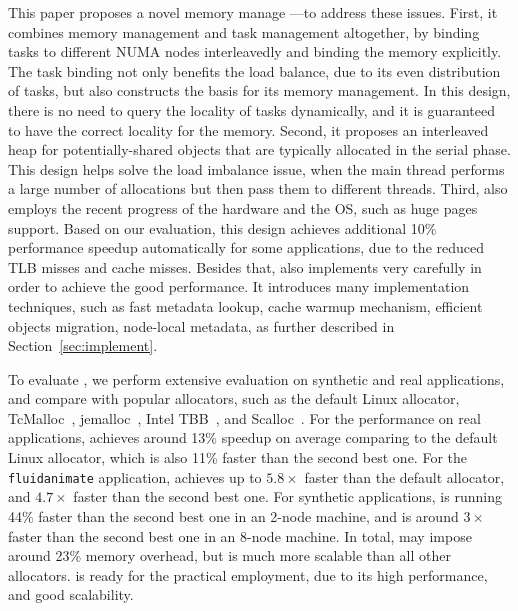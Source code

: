 This paper proposes a novel memory manage --\NM{}--to address these issues. First, it combines memory management and task management altogether, by binding tasks to different NUMA nodes interleavedly and binding the memory explicitly. The task binding not only benefits the load balance, due to its even distribution of tasks, but also constructs the basis for its memory management. In this design, there is no need to query the locality of tasks dynamically, and it is guaranteed to have the correct locality for the memory. Second, it proposes an interleaved heap for potentially-shared objects that are typically allocated in the serial phase. This design helps solve the load imbalance issue, when the main thread performs a large number of allocations but then pass them to different threads.  Third, \NM{} also employs the recent progress of the hardware and the OS, such as huge pages support. Based on our evaluation, this design achieves additional 10\% performance speedup automatically for some applications, due to the reduced TLB misses and cache misses. Besides that, \NM{} also implements very carefully in order to achieve the good performance. It introduces many implementation techniques, such as fast metadata lookup, cache warmup mechanism, efficient objects migration, node-local metadata, as further described in Section~\ref{sec:implement}. 
 



To evaluate \NM{}, we perform extensive evaluation on synthetic and real applications, and compare \NM{} with popular allocators, such as the default Linux allocator, TcMalloc~\cite{tcmalloc}, jemalloc~\cite{jemalloc}, Intel TBB~\cite{tbb}, and Scalloc~\cite{Scalloc}. For the performance on real applications, \NM{} achieves around 13\% speedup on average comparing to the default Linux allocator, which is also 11\% faster than the second best one. For the \texttt{fluidanimate} application, \NM{} achieves up to $5.8\times$ faster than the default allocator, and $4.7\times$ faster than the second best one. For synthetic applications, \NM{} is running 44\% faster than the second best one in an 2-node machine, and is around $3\times$ faster than the second best one in an 8-node machine.  In total, \NM{} may impose around 23\% memory overhead, but is much more scalable than all other allocators.  \NM{} is ready for the practical employment, due to its high performance, and good scalability. 

